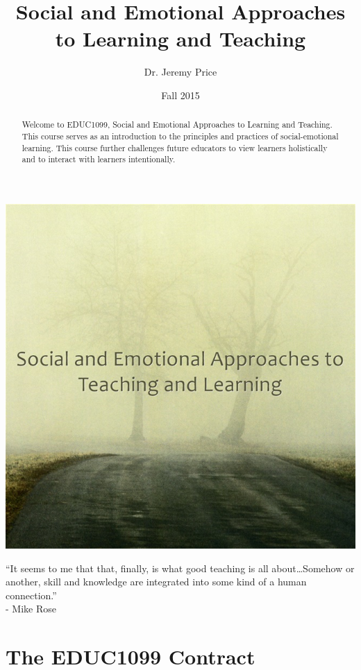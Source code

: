 \documentclass[two-side]{tufte-handout}
\title{Social and Emotional Approaches to Learning and Teaching}
\author{Dr. Jeremy Price}
\date{Fall 2015}  %
\begin{document}
\maketitle%

\begin{abstract}Welcome to EDUC1099, Social and Emotional Approaches to Learning and Teaching. This course serves as an introduction to the principles and practices of social-emotional learning. This course further challenges future educators to view learners holistically and to interact with learners intentionally.\end{abstract}

\bigskip
\begin{fullwidth}
	\begin{center}
		\includegraphics[width=0.40\linewidth]{sealt-logo.jpg}

		\bigskip

		\Large
		\enquote{It seems to me that that, finally, is what good teaching is all about\ldots Somehow or another, skill and knowledge are integrated into some kind of a human connection.}\\- Mike Rose
		\normalsize
	\end{center}
\end{fullwidth}



\newpage

\part{The EDUC1099 Contract}

\begin{fullwidth}



\end{fullwidth}

\newpage
\end{document}
